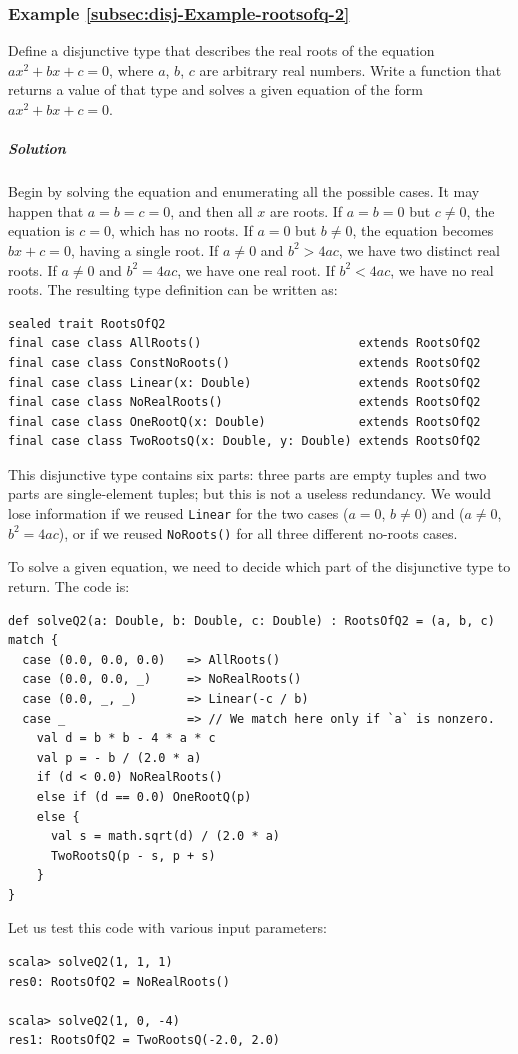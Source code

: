 \subsubsection{Example \label{subsec:disj-Example-rootsofq-2}\ref{subsec:disj-Example-rootsofq-2}}

Define a disjunctive type that describes the real roots of the equation
$ax^{2}+bx+c=0$, where $a$, $b$, $c$ are arbitrary real numbers.
Write a function that returns a value of that type and solves a given
equation of the form $ax^{2}+bx+c=0$.

\subparagraph{Solution}

Begin by solving the equation and enumerating all the possible cases.
It may happen that $a=b=c=0$, and then all $x$ are roots. If $a=b=0$
but $c\neq0$, the equation is $c=0$, which has no roots. If $a=0$
but $b\neq0$, the equation becomes $bx+c=0$, having a single root.
If $a\neq0$ and $b^{2}>4ac$, we have two distinct real roots. If
$a\neq0$ and $b^{2}=4ac$, we have one real root. If $b^{2}<4ac$,
we have no real roots. The resulting type definition can be written
as:
\begin{lstlisting}
sealed trait RootsOfQ2
final case class AllRoots()                      extends RootsOfQ2
final case class ConstNoRoots()                  extends RootsOfQ2
final case class Linear(x: Double)               extends RootsOfQ2
final case class NoRealRoots()                   extends RootsOfQ2
final case class OneRootQ(x: Double)             extends RootsOfQ2
final case class TwoRootsQ(x: Double, y: Double) extends RootsOfQ2
\end{lstlisting}
This disjunctive type contains six parts: three parts are empty tuples
and two parts are single-element tuples; but this is not a useless
redundancy. We would lose information if we reused \lstinline!Linear!
for the two cases ($a=0$, $b\neq0$) and ($a\neq0$, $b^{2}=4ac$),
or if we reused \lstinline!NoRoots()! for all three different no-roots
cases.

To solve a given equation, we need to decide which part of the disjunctive
type to return. The code is:
\begin{lstlisting}
def solveQ2(a: Double, b: Double, c: Double) : RootsOfQ2 = (a, b, c) match {
  case (0.0, 0.0, 0.0)   => AllRoots()
  case (0.0, 0.0, _)     => NoRealRoots()
  case (0.0, _, _)       => Linear(-c / b)
  case _                 => // We match here only if `a` is nonzero.
    val d = b * b - 4 * a * c
    val p = - b / (2.0 * a)
    if (d < 0.0) NoRealRoots()
    else if (d == 0.0) OneRootQ(p)
    else {
      val s = math.sqrt(d) / (2.0 * a)
      TwoRootsQ(p - s, p + s)
    }
}
\end{lstlisting}
Let us test this code with various input parameters:
\begin{lstlisting}
scala> solveQ2(1, 1, 1)
res0: RootsOfQ2 = NoRealRoots()

scala> solveQ2(1, 0, -4)
res1: RootsOfQ2 = TwoRootsQ(-2.0, 2.0)
\end{lstlisting}


